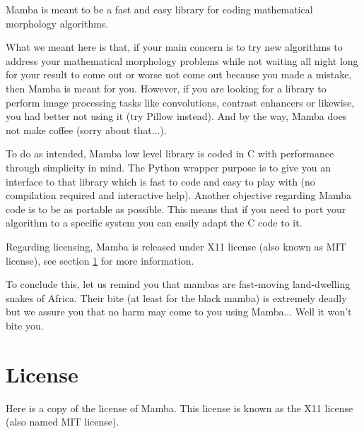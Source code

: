 \documentclass[a4paper,10pt,oneside]{article}
\begin{document}
Mamba is meant to be a fast and easy library for coding mathematical morphology 
algorithms.

What we meant here is that, if your main concern is to try new algorithms to 
address your mathematical morphology problems while not waiting all night long 
for your result to come out or worse not come out because you made a mistake, 
then Mamba is meant for you. However, if you are looking for a library to perform
image processing tasks like convolutions, contrast enhancers or likewise, you 
had better not using it (try Pillow instead). And by the way, Mamba does not make 
coffee (sorry about that...).

To do as intended, Mamba low level library is coded in C with performance through
simplicity in mind. The Python wrapper purpose is to give you an interface to 
that library which is fast to code and easy to play with (no compilation required 
and interactive help). Another objective regarding Mamba code is to be as 
portable as possible. This means that if you need to port your algorithm to a 
specific system you can easily adapt the C code to it.

Regarding licensing, Mamba is released under X11 license (also known as MIT 
license), see section \ref{cha:License} for more information.

To conclude this, let us remind you that mambas are fast-moving land-dwelling 
snakes of Africa. Their bite (at least for the black mamba) is extremely deadly 
but we assure you that no harm may come to you using Mamba... Well it won't bite
you.

\pagebreak

\section{License}
\label{cha:License}

Here is a copy of the license of Mamba. This license is known as the X11 license
(also named MIT license).

\vspace{0.5cm}
\end{document}
